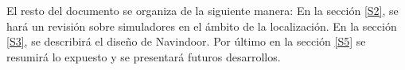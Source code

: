 
El resto del documento se organiza de la siguiente manera: En la sección \ref{S2}, se hará un revisión sobre simuladores en el ámbito de la localización. En la  sección \ref{S3}, se describirá el diseño de Navindoor. Por último en la sección \ref{S5} se resumirá lo expuesto y se presentará futuros desarrollos. 